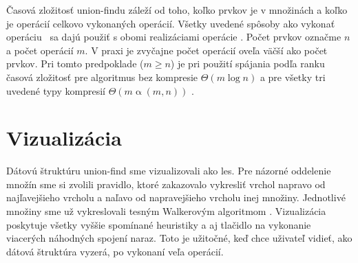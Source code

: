 Časová zložitosť union-findu záleží od toho, koľko prvkov je v množinách a koľko je 
operácií celkovo vykonaných operácií. Všetky uvedené spôsoby ako vykonať 
operáciu \find\ sa dajú použiť s obomi realizáciami operácie \union. 
Počet prvkov označme $n$ a počet operácií $m$. V praxi je zvyčajne počet 
operácií oveľa väčší ako počet prvkov. Pri tomto predpoklade ($m\geq n$) je 
pri použití spájania podľa ranku časová zložitosť pre algoritmus bez kompresie 
$\Theta(m\log n)$ a pre všetky tri uvedené typy kompresií 
$\Theta(m\mathop{\alpha}(m,n))$ \citep{paths2}.

\section{Vizualizácia}
Dátovú štruktúru union-find sme vizualizovali ako les. Pre názorné 
oddelenie množín sme si zvolili pravidlo, ktoré zakazovalo vykresliť vrchol 
napravo od najľavejšieho vrcholu a naľavo od napravejšieho vrcholu inej 
množiny. Jednotlivé množiny sme už vykreslovali tesným Walkerovým algoritmom 
\citep{walker}. Vizualizácia poskytuje všetky vyššie spomínané heuristiky a 
aj tlačidlo na vykonanie viacerých náhodných spojení naraz. Toto je užitočné, 
keď chce uživateľ vidieť, ako dátová štruktúra vyzerá, po vykonaní 
veľa operácií.




